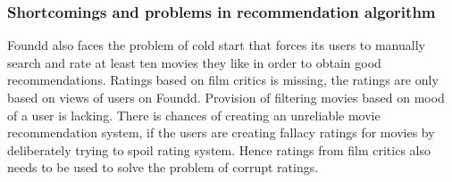   \subsubsection{Shortcomings and problems in recommendation algorithm}
  \label{Foundd_overview_SP}
    Foundd also faces the problem of cold start that forces its users to manually search and rate at least ten movies they like in order to obtain good recommendations. Ratings based on film critics is missing, the ratings are only based on views of users on Foundd. Provision of filtering movies based on mood of a user is lacking. There is chances of creating an unreliable movie recommendation system, if the users are creating fallacy ratings for movies by deliberately trying to spoil rating system. Hence ratings from film critics also needs to be used to solve the problem of corrupt ratings. 
    
